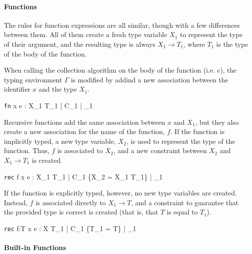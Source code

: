 \documentclass[class=article, crop=false]{standalone}
\begin{document}
\paragraph{Functions}

The rules for function expressions are all similar, though with a few differences between them.
All of them create a fresh type variable $X_1$ to represent the type of their argument, and the resulting type is always $X_1 \rightarrow T_1$, where $T_1$ is the type of the body of the function.

When calling the collection algorithm on the body of the function (i.e. $e$), the typing environment $\Gamma$ is modified by addind a new association between the identifier $x$ and the type $X_1$.

    {\Gamma \vdash \texttt{fn} \; x \Rightarrow e : X_1 \rightarrow T_1 \; | \; C_1 \; | \; \gamma_1}


Recursive functions add the same association between $x$ and $X_1$, but they also create a new association for the name of the function, $f$.
If the function is implicitly typed, a new type variable, $X_2$, is used to represent the type of the function.
Thus, $f$ is associated to $X_2$, and a new constraint between $X_2$ and $X_1 \rightarrow T_1$ is created.

    {\Gamma \vdash \texttt{rec} \; f \; x \Rightarrow e : X_1 \rightarrow T_1 \; | \; C_1 \cup \{X_2 = X_1 \rightarrow T_1\} \; | \; \gamma_1}

If the function is explicitly typed, however, no new type variables are created.
Instead, $f$ is associated directly to $X_1 \rightarrow T$, and a constraint to guarantee that the provided type is correct is created (that is, that $T$ is equal to $T_1$).

    {\Gamma \vdash \texttt{rec} \; f:T \; \; x \Rightarrow e : X \rightarrow T_1 \; | \; C_1 \cup \{T_1 = T\} \; | \; \gamma_1}

\paragraph{Built-in Functions}
\end{document}
